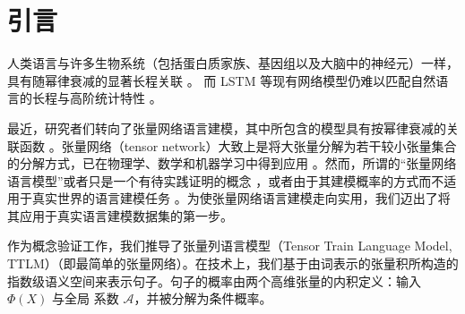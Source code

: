 \section{引言}



人类语言与许多生物系统（包括蛋白质家族、基因组以及大脑中的神经元）一样，具有随幂律衰减的显著长程关联 \citep{tagliazucchi2012criticality, mora2011biological}。
而 LSTM \cite{hochreiter1997long} 等现有网络模型仍难以匹配自然语言的长程与高阶统计特性 \citep{lin2016critical}。


最近，研究者们转向了张量网络语言建模，其中所包含的模型具有按幂律衰减的关联函数 \citep{pestun2017tensor,pestun2017language,miller2021tensor}。张量网络（tensor network）大致上是将大张量分解为若干较小张量集合的分解方式，已在物理学、数学和机器学习中得到应用 \citep{cohen2016expressive}。然而，所谓的“张量网络语言模型”或者只是一个有待实践证明的概念 \cite{pestun2017tensor}，或者由于其建模概率的方式而不适用于真实世界的语言建模任务 \citep{miller2021tensor}。为使张量网络语言建模走向实用，我们迈出了将其应用于真实语言建模数据集的第一步。

作为概念验证工作，我们推导了张量列语言模型（Tensor Train Language Model, TTLM）（即最简单的张量网络）。在技术上，我们基于由词表示的张量积所构造的指数级语义空间来表示句子。句子的概率由两个高维张量的内积定义：输入 $\Phi(X)$ 与全局
系数 $\mathcal{A}$，并被分解为条件概率。

